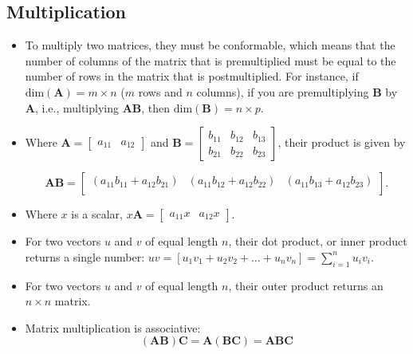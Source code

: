 \documentclass[12pt, letterpaper]{article}
\begin{document}
\subsection{Multiplication}
\begin{itemize}

\item To multiply two matrices, they must be conformable, which means that the number of columns of the matrix that is premultiplied must be equal to the number of rows in the matrix that is postmultiplied. For instance, if $\text{dim}\left(\mathbf{A}\right) = m \times n$ ($m$ rows and $n$ columns), if you are premultiplying $\mathbf{B}$ by $\mathbf{A}$, i.e., multiplying $\mathbf{A}\mathbf{B}$, then $\text{dim}\left(\mathbf{B}\right) = n \times p$.

\item Where $
\mathbf{A} = \left[
\begin{array}{cc}
a_{11}& a_{12} 
\end{array} \right] $ and 
$\mathbf{B} = \left[
\begin{array}{ccc}
b_{11} & b_{12} & b_{13} \\
b_{21} & b_{22} & b_{23} 
\end{array} \right]$, their product is given by

\begin{equation*}
\mathbf{A} \mathbf{B}  =  \left[
\begin{array}{ccc}
(a_{11}b_{11} + a_{12}b_{21}) & (a_{11}b_{12} + a_{12}b_{22}) & (a_{11}b_{13} + a_{12}b_{23}) \\
\end{array} \right].
\end{equation*}

\item Where $x$ is a scalar, $x\mathbf{A} = \left[
\begin{array}{cc}
a_{11}x& a_{12}x 
\end{array} \right]$.

\item For two vectors $u$ and $v$ of equal length $n$, their dot product, or inner product returns a single number: $uv = \left[u_{1}v_{1} + u_{2}v_{2} + \ldots + u_{n}v_{n}\right] = \sum_{i=1}^{n} u_{i}v_{i}$.

\item For two vectors $u$ and $v$ of equal length $n$, their outer product returns an $n \times n$ matrix.

\item Matrix multiplication is associative:
\begin{equation*}
\left(\mathbf{A}\mathbf{B}\right)\mathbf{C} = \mathbf{A}\left(\mathbf{B}\mathbf{C}\right) = \mathbf{A}\mathbf{B}\mathbf{C}
\end{equation*}


\end{itemize}
\end{document}
